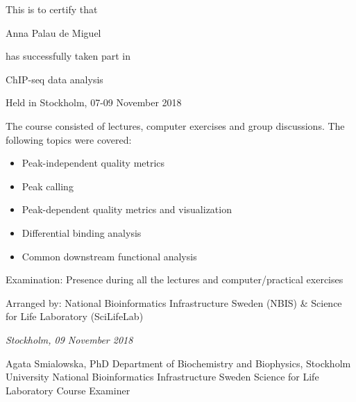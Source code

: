 \documentclass[12pt]{article}\usepackage[]{graphicx}\usepackage[]{color}
\newcommand{\courseName}{ChIP-seq data analysis}
\newcommand{\coursePoints}{1 hp}
\newcommand{\courseLocation}{Stockholm}
\newcommand{\courseDate}{07-09 November 2018}
\newcommand{\courseLastDay}{09 November 2018}
\newcommand{\courseExaminer}{Agata Smialowska, PhD}
\begin{document}
\large
This is to certify that 


\LARGE
\color{blue} 
Anna Palau de Miguel
\color{black} 

\large
has successfully taken part in \newline \newline

\color{blue} 
\LARGE
\begin{center}{\courseName}  \end{center} 
\color{black} 

\large
\begin{center} Held in {\courseLocation}, {\courseDate} \end{center} 

\vspace{8mm}
\normalsize
The course consisted of lectures, computer exercises and group discussions. The following topics were covered:
\begin{itemize}
  \item Peak-independent quality metrics
  \item Peak calling
  \item Peak-dependent quality metrics and visualization
  \item Differential binding analysis
  \item Common downstream functional analysis
\end{itemize}


\vspace{12mm}
Examination: \newline
Presence during all the lectures and computer/practical exercises

\vspace{12mm}
Arranged by: \newline
National Bioinformatics Infrastructure Sweden (NBIS) \& Science for Life Laboratory (SciLifeLab)


\vspace{5mm}
\textit{{\courseLocation}, {\courseLastDay}}
\vspace{15mm}


{\courseExaminer} \newline
\small
Department of Biochemistry and Biophysics, Stockholm University \newline
National Bioinformatics Infrastructure Sweden \newline
Science for Life Laboratory \newline
Course Examiner



\end{document}
